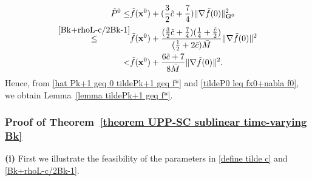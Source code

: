 \documentclass[12pt,draftcls,onecolumn]{IEEEtran}
\begin{document}
\begin{align}
	\tilde{P}^0\leq& \tilde{f}(\mathbf{x}^0)+ (\frac{3}{2}\tilde{c}+\frac{7}{4})\|\nabla \tilde{f}(0)\|^2_{\mathbf{G}^0}\notag\\
	\overset{\eqref{Bk+rhoL-c/2Bk-1}}{\leq} &\tilde{f}(\mathbf{x}^0) +\frac{(\frac{3}{2}\tilde{c}+\frac{7}{4})(\frac{1}{4}+\frac{\tilde{c}}{2})}{(\frac{1}{2}+2\tilde{c})\bar{M}}\|\nabla \tilde{f}(0)\|^2 \notag\\
	< & \tilde{f}(\mathbf{x}^0) +\frac{6\tilde{c}+7}{8\bar{M}}\|\nabla \tilde{f}(0)\|^2. \label{tildeP0 leq fx0+nabla f0}
\end{align}
Hence, from \eqref{hat Pk+1 geq 0 tildePk+1 geq f*} and \eqref{tildeP0 leq fx0+nabla f0}, we obtain Lemma~\ref{lemma tildePk+1 geq f*}.
\subsubsection{Proof of Theorem~\ref{theorem UPP-SC sublinear time-varying Bk}}\label{proof theorem UPP-SC sublinear time-varying Bk}

\textbf{(i)} First we illustrate the feasibility of the parameters in \eqref{define tilde c} and \eqref{Bk+rhoL-c/2Bk-1}. 


\end{document}
